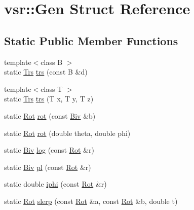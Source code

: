 \hypertarget{structvsr_1_1_gen}{\section{vsr\-:\-:Gen Struct Reference}
\label{structvsr_1_1_gen}
}
\subsection*{Static Public Member Functions}
\begin{DoxyCompactItemize}
\item 
{\footnotesize template$<$class B $>$ }\\static \hyperlink{namespacevsr_a58de571aec98277e144de8864db2b027}{Trs} \hyperlink{structvsr_1_1_gen_a68e9053727c0901839b78cc94710839f}{trs} (const B \&d)
\item 
{\footnotesize template$<$class T $>$ }\\static \hyperlink{namespacevsr_a58de571aec98277e144de8864db2b027}{Trs} \hyperlink{structvsr_1_1_gen_aa2da5aef3b14b940fb07180392bb56fa}{trs} (T x, T y, T z)
\item 
static \hyperlink{namespacevsr_aa1af5d33b552dd31499209a8f68548e8}{Rot} \hyperlink{structvsr_1_1_gen_ac28b8e8cf234c133f4aa9910626bcb75}{rot} (const \hyperlink{namespacevsr_ab2f5aee828c6c805b8a86a5b077d192c}{Biv} \&b)
\item 
static \hyperlink{namespacevsr_aa1af5d33b552dd31499209a8f68548e8}{Rot} \hyperlink{structvsr_1_1_gen_aecd58d5cdf4406a946d9f91af5a96fcc}{rot} (double theta, double phi)
\item 
static \hyperlink{namespacevsr_ab2f5aee828c6c805b8a86a5b077d192c}{Biv} \hyperlink{structvsr_1_1_gen_aef0d49b39f8223f53ccaf99b4590c3ec}{log} (const \hyperlink{namespacevsr_aa1af5d33b552dd31499209a8f68548e8}{Rot} \&r)
\item 
static \hyperlink{namespacevsr_ab2f5aee828c6c805b8a86a5b077d192c}{Biv} \hyperlink{structvsr_1_1_gen_ac623efd2bfa359e76f5d2c1d8ce81f14}{pl} (const \hyperlink{namespacevsr_aa1af5d33b552dd31499209a8f68548e8}{Rot} \&r)
\item 
static double \hyperlink{structvsr_1_1_gen_ad42f415b051fa475f55de57a250fe37f}{iphi} (const \hyperlink{namespacevsr_aa1af5d33b552dd31499209a8f68548e8}{Rot} \&r)
\item 
static \hyperlink{namespacevsr_aa1af5d33b552dd31499209a8f68548e8}{Rot} \hyperlink{structvsr_1_1_gen_a563661ad5c3d06a62ae23fdb258464cb}{slerp} (const \hyperlink{namespacevsr_aa1af5d33b552dd31499209a8f68548e8}{Rot} \&a, const \hyperlink{namespacevsr_aa1af5d33b552dd31499209a8f68548e8}{Rot} \&b, double t)

\end{DoxyCompactItemize}
